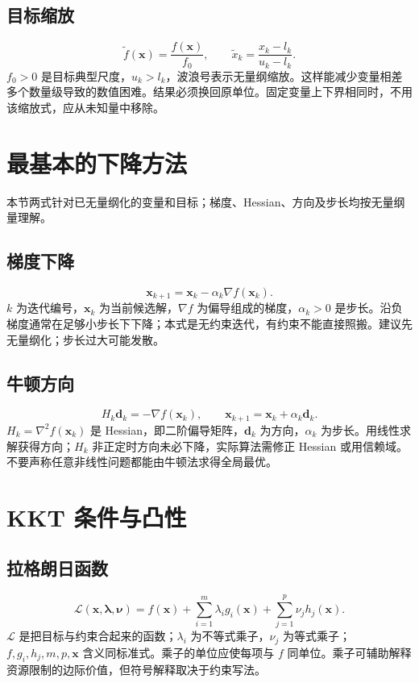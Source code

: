 \documentclass[UTF8,zihao=-4,openany,oneside,fontset=windows]{ctexbook}
\begin{document}
\subsection{目标缩放}
\begin{equation}\widetilde f(\boldsymbol x)=\frac{f(\boldsymbol x)}{f_0},\qquad \widetilde x_k=\frac{x_k-l_k}{u_k-l_k}.\end{equation}
$f_0>0$ 是目标典型尺度，$u_k>l_k$，波浪号表示无量纲缩放。这样能减少变量相差多个数量级导致的数值困难。结果必须换回原单位。固定变量上下界相同时，不用该缩放式，应从未知量中移除。

\section{最基本的下降方法}
本节两式针对已无量纲化的变量和目标；梯度、Hessian、方向及步长均按无量纲量理解。
\subsection{梯度下降}
\begin{equation}\boldsymbol x_{k+1}=\boldsymbol x_k-\alpha_k\nabla f(\boldsymbol x_k).\end{equation}
$k$ 为迭代编号，$\boldsymbol x_k$ 为当前候选解，$\nabla f$ 为偏导组成的梯度，$\alpha_k>0$ 是步长。沿负梯度通常在足够小步长下下降；本式是无约束迭代，有约束不能直接照搬。建议先无量纲化；步长过大可能发散。
\subsection{牛顿方向}
\begin{equation}H_k\boldsymbol d_k=-\nabla f(\boldsymbol x_k),\qquad \boldsymbol x_{k+1}=\boldsymbol x_k+\alpha_k\boldsymbol d_k.\end{equation}
$H_k=\nabla^2 f(\boldsymbol x_k)$ 是 Hessian，即二阶偏导矩阵，$\boldsymbol d_k$ 为方向，$\alpha_k$ 为步长。用线性求解获得方向；$H_k$ 非正定时方向未必下降，实际算法需修正 Hessian 或用信赖域。不要声称任意非线性问题都能由牛顿法求得全局最优。

\section{KKT 条件与凸性}
\subsection{拉格朗日函数}
\begin{equation}\mathcal L(\boldsymbol x,\boldsymbol\lambda,\boldsymbol\nu)=f(\boldsymbol x)+\sum_{i=1}^m\lambda_i g_i(\boldsymbol x)+\sum_{j=1}^p\nu_j h_j(\boldsymbol x).\end{equation}
$\mathcal L$ 是把目标与约束合起来的函数；$\lambda_i$ 为不等式乘子，$\nu_j$ 为等式乘子；$f,g_i,h_j,m,p,\boldsymbol x$ 含义同标准式。乘子的单位应使每项与 $f$ 同单位。乘子可辅助解释资源限制的边际价值，但符号解释取决于约束写法。
\end{document}
